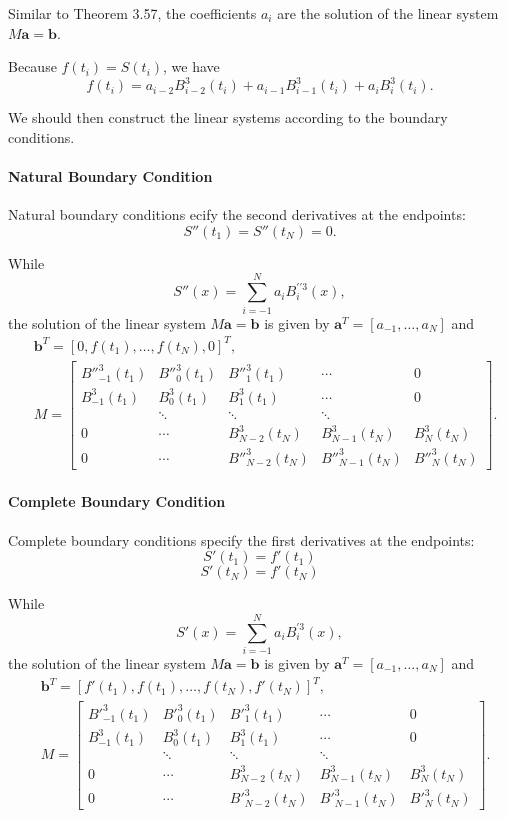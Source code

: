 \documentclass[a4paper]{article}
\begin{document}
\begin{sloppypar}
Similar to Theorem 3.57, the coefficients $a_i$ are the solution of the linear system $M\mathbf{a} = \mathbf{b}$.

Because $f(t_i)=S(t_i)$, we have
$$f(t_i)=a_{i-2}B^3_{i-2}(t_i)+a_{i-1}B^3_{i-1}(t_i)+a_{i}B^3_{i}(t_i).$$

We should then construct the linear systems according to the boundary conditions.

\paragraph*{Natural Boundary Condition}
Natural boundary conditions ecify the second derivatives at the endpoints:
\[ S''(t_1) = S''(t_N) = 0. \]

While $$
S''(x)=\sum_{i=-1}^{N}a_iB^{\prime \prime 3}_i(x),
$$
the solution of the linear system $M \mathbf{a} = \mathbf{b}$ is given by
$\mathbf{a}^T = [a_{-1}, \ldots, a_{N}]$
and
$$
\begin{aligned}
&\mathbf{b}^T = \left[ 0, f(t_1), \ldots, f(t_{N}), 0 \right]^T, \\
&M = \begin{bmatrix}
B''^3_{-1}(t_1) & B''^3_{0}(t_1) & B''^3_{1}(t_1)  & \cdots &0\\
B^3_{-1}(t_1) & B^3_{0}(t_1) & B^3_{1}(t_1)  & \cdots &0\\
& \ddots & \ddots & \ddots \\
0&\cdots& B^3_{N-2}(t_N) & B^3_{N-1}(t_N) & B^3_{N}(t_N) \\
0&\cdots&B''^3_{N-2}(t_N) & B''^3_{N-1}(t_N) & B''^3_{N}(t_N)
\end{bmatrix}.
\end{aligned}
$$

\paragraph*{Complete Boundary Condition}
Complete boundary conditions specify the first derivatives at the endpoints:
\[ S'(t_1) = f'(t_1) \]
\[ S'(t_N) = f'(t_N) \]

While $$
S'(x)=\sum_{i=-1}^{N}a_iB^{\prime 3}_i(x),
$$
the solution of the linear system $M \mathbf{a} = \mathbf{b}$ is given by
$\mathbf{a}^T = [a_{-1}, \ldots, a_{N}]$
and
$$
\begin{aligned}
&\mathbf{b}^T = \left[ f'(t_1), f(t_1), \ldots, f(t_{N}), f'(t_N) \right]^T, \\
&M = \begin{bmatrix}
B'^3_{-1}(t_1) & B'^3_{0}(t_1) & B'^3_{1}(t_1)  & \cdots &0\\
B^3_{-1}(t_1) & B^3_{0}(t_1) & B^3_{1}(t_1)  & \cdots &0\\
& \ddots & \ddots & \ddots \\
0&\cdots& B^3_{N-2}(t_N) & B^3_{N-1}(t_N) & B^3_{N}(t_N) \\
0&\cdots&B'^3_{N-2}(t_N) & B'^3_{N-1}(t_N) & B'^3_{N}(t_N)
\end{bmatrix}.
\end{aligned}
$$


\end{sloppypar}
\end{document}
